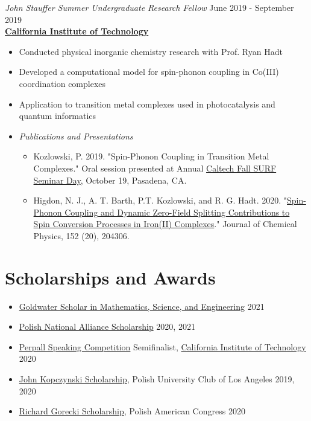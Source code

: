 \documentclass[margin,line]{resume}
\begin{document}
\begin{resume}
\begin{itemize}
\begin{itemize}
    \end{itemize}
\end{itemize} 
{\sl John Stauffer Summer Undergraduate Research Fellow} \hfill June 2019 - September 2019 \\
\textbf{\href{https://www.caltech.edu/}{California Institute of Technology}}
\begin{itemize}
\item Conducted physical inorganic chemistry research with Prof. Ryan Hadt
\item Developed a computational model for spin-phonon coupling in Co(III)
coordination complexes
\item Application to transition metal complexes used in photocatalysis and quantum informatics
\item \emph{Publications and Presentations}
    \begin{itemize}
            \item Kozlowski, P. 2019. "Spin-Phonon Coupling in Transition Metal Complexes." Oral session presented at Annual \href{https://www.caltech.edu/campus-life-events/calendar/surf-seminar-day-86934}{Caltech Fall SURF Seminar Day}, October 19, Pasadena, CA.
    \item Higdon, N. J., A. T. Barth, P.T. Kozlowski, and R. G. Hadt. 2020. "\href{https://doi.org/10.1063/5.0006361}{Spin-Phonon Coupling and Dynamic Zero-Field Splitting Contributions to Spin Conversion Processes in Iron(II) Complexes}." Journal of Chemical Physics, 152 (20), 204306.
    \end{itemize}
\end{itemize}
\section{\mysidestyle Scholarships and Awards}
\begin{itemize}
    \item  \textnormal{\href{https://goldwaterscholarship.gov/}{Goldwater Scholar in Mathematics, Science, and Engineering}} \hfill 2021
    \item \textnormal{\href{https://pna-znp.org/fraternal-benefits/the-pna-scholarship-award-program-for-academic-year-2022-2023-is-now-open/}{Polish National Alliance Scholarship}} \hfill 2020, 2021
    \item \textnormal{\href{https://www.caltech.edu/campus-life-events/calendar/perpal-surf-speaking-competition-finals-89788}{Perpall Speaking Competition} Semifinalist, \href{https://www.caltech.edu/}{California Institute of Technology}} \hfill 2020
    \item \textnormal{\href{https://www.pucla.org/name-scholarships/}{John Kopczynski Scholarship}, Polish University Club of Los Angeles} \hfill 2019, 2020
    \item \textnormal{\href{https://www.paccf.org/richard-gorecki-scholarship1}{Richard Gorecki Scholarship}, Polish American Congress} \hfill 2020
\end{itemize}


\end{resume}
\end{document}
